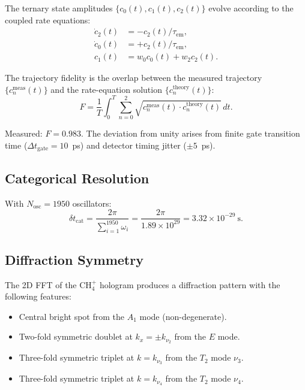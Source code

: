 \documentclass[11pt,a4paper]{article}
\theoremstyle{definition}
\theoremstyle{remark}
\begin{document}
The ternary state amplitudes $\{c_0(t), c_1(t), c_2(t)\}$ evolve according to the coupled rate equations:
\begin{align}
\dot{c}_2(t) &= -c_2(t)/\tau_{\mathrm{em}}, \\
\dot{c}_0(t) &= +c_2(t)/\tau_{\mathrm{em}}, \\
c_1(t) &= w_0 c_0(t) + w_2 c_2(t).
\end{align}

The trajectory fidelity is the overlap between the measured trajectory $\{c_n^{\mathrm{meas}}(t)\}$ and the rate-equation solution $\{c_n^{\mathrm{theory}}(t)\}$:
\begin{equation}
F = \frac{1}{T} \int_0^T \sum_{n=0}^2 \sqrt{c_n^{\mathrm{meas}}(t) \cdot c_n^{\mathrm{theory}}(t)} \, dt.
\end{equation}

Measured: $F = 0.983$. The deviation from unity arises from finite gate transition time ($\Delta t_{\mathrm{gate}} = 10$~ps) and detector timing jitter ($\pm 5$~ps).

\subsection{Categorical Resolution}

With $N_{\mathrm{osc}} = 1950$ oscillators:
\begin{equation}
\delta t_{\mathrm{cat}} = \frac{2\pi}{\sum_{i=1}^{1950} \omega_i} = \frac{2\pi}{1.89 \times 10^{29}} = 3.32 \times 10^{-29}~\mathrm{s}.
\end{equation}

\subsection{Diffraction Symmetry}

The 2D FFT of the CH$_4^+$ hologram produces a diffraction pattern with the following features:
\begin{itemize}
  \item Central bright spot from the $A_1$ mode (non-degenerate).
  \item Two-fold symmetric doublet at $k_x = \pm k_{\nu_2}$ from the $E$ mode.
  \item Three-fold symmetric triplet at $k = k_{\nu_3}$ from the $T_2$ mode $\nu_3$.
  \item Three-fold symmetric triplet at $k = k_{\nu_4}$ from the $T_2$ mode $\nu_4$.
\end{itemize}
\end{document}
